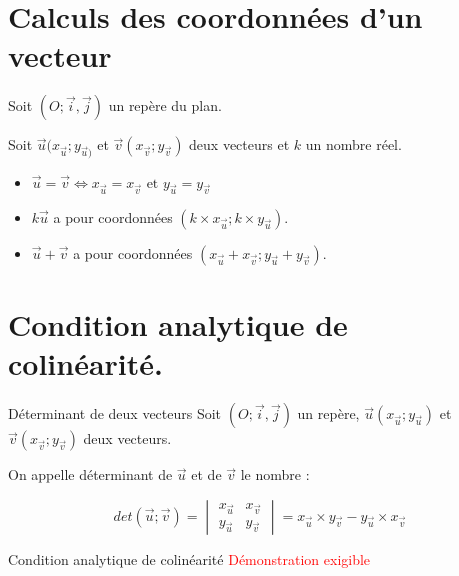 
\begin{pageCours} %


\section{Calculs des coordonnées d'un vecteur}

\begin{Pp}
Soit $(O;\vec{i},\vec{j})$ un repère du plan.

Soit $\vec{u}(x_{\vec{u}};y_{\vec{u})}$ et $\vec{v}(x_{\vec{v}};y_{\vec{v}})$  deux vecteurs et $k$ un nombre réel.
\begin{itemize}
\item $\vec{u}=\vec{v}\Leftrightarrow x_{\vec{u}}=x_{\vec{v}}\text{ et }y_{\vec{u}}=y_{\vec{v}}$
\item $k\vec{u}$ a pour coordonnées $(k\times x_{\vec{u}};k\times y_{\vec{u}})$.
\item $\vec{u}+\vec{v}$ a pour coordonnées $(x_{\vec{u}}+x_{\vec{v}};y_{\vec{u}}+y_{\vec{v}})$.
\end{itemize}
\end{Pp}

\section{Condition analytique de colinéarité.}

\begin{DefT}{Déterminant de deux vecteurs}
Soit $(O;\vec{i},\vec{j})$ un repère, $\vec{u}(x_{\vec{u}};y_{\vec{u}})$ et $\vec{v}(x_{\vec{v}};y_{\vec{v}})$ deux vecteurs.

On appelle déterminant de $\vec{u}$ et de $\vec{v}$ le nombre : 

\[det(\vec{u};\vec{v})=\begin{vmatrix}
x_{\vec{u}} & x_{\vec{v}} \\
y_{\vec{u}} & y_{\vec{v}}
\end{vmatrix} =x_{\vec{u}}\times y_{\vec{v}}-y_{\vec{u}}\times x_{\vec{v}}\]

\end{DefT}

\begin{PpT}{Condition analytique de colinéarité}
\textcolor{red}{Démonstration exigible}


\end{PpT}
\end{pageCours}
